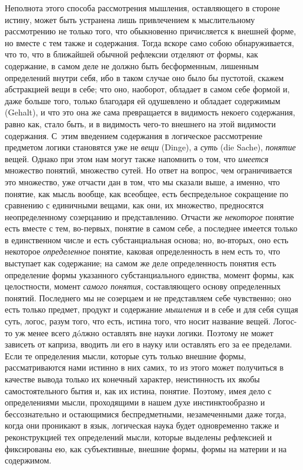 Неполнота этого способа рассмотрения мышления, оставляющего в стороне
истину, может быть устранена лишь привлечением к мыслительному рассмотрению
не только того, что обыкновенно причисляется к внешней форме, но вместе с
тем также и содержания. Тогда вскоре само собою обнаруживается, что то, что
в ближайшей обычной рефлексии отделяют от формы, как содержание, в самом
деле не должно быть бесформенным, лишенным определений внутри себя, ибо в
таком случае оно было бы пустотой, скажем абстракцией вещи в себе; что оно,
наоборот, обладает в самом себе формой и, даже больше того, только
благодаря ей одушевлено и обладает содержимым (Gehalt), и что это она же
сама превращается в видимость некоего содержания, равно как, стало быть, и
в видимость чего-то внешнего на этой видимости содержания. С~этим введением
содержания в логическое рассмотрение предметом логики становятся уже не
{\em вещи} (Dinge), а {\em суть}
(die Sache), {\em понятие} вещей. Однако при этом нам
могут также напомнить о том, что {\em имеется}
множество понятий, множество сутей. Но ответ на вопрос, чем ограничивается
это множество, уже отчасти дан в том, что мы сказали выше, а именно, что
понятие, как мысль вообще, как всеобщее, есть беспредельное сокращение по
сравнению с единичными вещами, как они, их множество, предносятся
неопределенному созерцанию и представлению. Отчасти же
{\em некоторое} понятие есть вместе с тем, во-первых,
понятие в самом себе, а последнее имеется только в единственном числе и
есть субстанциальная основа; но, во-вторых, оно есть некоторое
{\em определенное} понятие, каковая определенность в
нем есть то, что выступает как содержание; на самом же деле определенность
понятия есть определение формы указанного субстанциального единства, момент
формы, как целостности, момент {\em самого понятия},
составляющего основу определенных понятий. Последнего мы не созерцаем и не
представляем себе чувственно; оно есть только предмет, продукт и содержание
{\em мышления} и в себе и для себя сущая суть, логос,
разум того, что есть, истина того, что носит название вещей. Логос-то уж
менее всего дóлжно оставлять вне науки логики. Поэтому не может зависеть от
каприза, вводить ли его в науку или оставлять его за ее пределами. Если те
определения мысли, которые суть только внешние формы, рассматриваются нами
истинно в них самих, то из этого может получиться в качестве вывода только
их конечный характер, неистинность их якобы самостоятельного бытия и, как
их истина, понятие. Поэтому, имея дело с определениями мысли, проходящими в
нашем духе инстинктообразно и бессознательно и остающимися беспредметными,
незамеченными даже тогда, когда они проникают в язык, логическая наука
будет одновременно также и реконструкцией тех определений мысли, которые
выделены рефлексией и фиксированы ею, как субъективные, внешние формы,
формы на материи и на содержимом.

